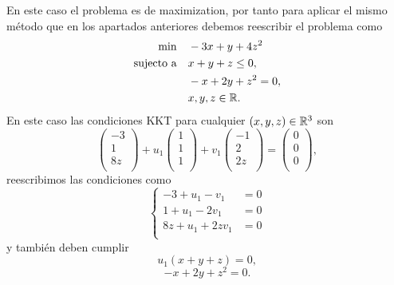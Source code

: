 En este caso el problema es de maximization,
por tanto para aplicar el mismo método que en los apartados anteriores debemos reescribir el problema como
\begin{equation} \label{orginal_problem_c}
\begin{aligned}
    \min \quad & -3 x + y + 4 z^2 \\
    \text{sujecto a} \quad & x + y + z \leq 0, \\
        & -x + 2y + z^2 = 0, \\
        & x, y, z \in \mathbb{R}.
\end{aligned}
\end{equation}
En este caso las condiciones KKT para cualquier $(x, y, z) \in \mathbb{R}^3$ son
\begin{equation*}
    \begin{pmatrix}
        -3 \\
        1 \\
        8z \\
    \end{pmatrix}
    + u_1
    \begin{pmatrix}
        1 \\
        1 \\
        1 \\
    \end{pmatrix}
    + v_1
    \begin{pmatrix}
        -1 \\
        2 \\
        2z \\
    \end{pmatrix}
    =
    \begin{pmatrix}
        0 \\
        0 \\
        0 \\
    \end{pmatrix},
\end{equation*}
reescribimos las condiciones como
\begin{equation*}
\left\{
\begin{aligned}
    - 3 + u_1 - v_1 & = 0 \\
    1 + u_1 - 2 v_1 & = 0 \\
    8 z + u_1 + 2 z v_1 & = 0 \\
\end{aligned}
\right.
\end{equation*}
y también deben cumplir
\begin{equation*}
    u_1 (x + y + z) = 0,
\end{equation*}
\begin{equation*}
    -x + 2 y + z^2 = 0.
\end{equation*}

